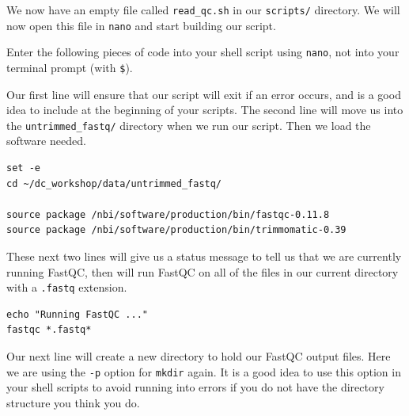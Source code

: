 \documentclass[
  letterpaper,
  DIV=11,
  numbers=noendperiod]{scrreprt}
\newenvironment{Shaded}{\begin{snugshade}}{\end{snugshade}}
\newcommand{\ExtensionTok}[1]{\textcolor[rgb]{0.00,0.23,0.31}{#1}}
\newcommand{\NormalTok}[1]{\textcolor[rgb]{0.00,0.23,0.31}{#1}}
\begin{document}
We now have an empty file called \texttt{read\_qc.sh} in our
\texttt{scripts/} directory. We will now open this file in \texttt{nano}
and start building our script.

\begin{Shaded}
\end{Shaded}

\begin{tcolorbox}[enhanced jigsaw, toptitle=1mm, breakable, bottomrule=.15mm, colback=white, toprule=.15mm, opacityback=0, bottomtitle=1mm, coltitle=black, opacitybacktitle=0.6, rightrule=.15mm, colframe=quarto-callout-warning-color-frame, titlerule=0mm, colbacktitle=quarto-callout-warning-color!10!white, title=\textcolor{quarto-callout-warning-color}{\faExclamationTriangle}\hspace{0.5em}{Warning}, left=2mm, leftrule=.75mm, arc=.35mm]

Enter the following pieces of code into your shell script using
\texttt{nano}, not into your terminal prompt (with \texttt{\$}).

\end{tcolorbox}

Our first line will ensure that our script will exit if an error occurs,
and is a good idea to include at the beginning of your scripts. The
second line will move us into the \texttt{untrimmed\_fastq/} directory
when we run our script. Then we load the software needed.

\begin{verbatim}
set -e
cd ~/dc_workshop/data/untrimmed_fastq/

source package /nbi/software/production/bin/fastqc-0.11.8
source package /nbi/software/production/bin/trimmomatic-0.39
\end{verbatim}

These next two lines will give us a status message to tell us that we
are currently running FastQC, then will run FastQC on all of the files
in our current directory with a \texttt{.fastq} extension.

\begin{verbatim}
echo "Running FastQC ..."
fastqc *.fastq*
\end{verbatim}

Our next line will create a new directory to hold our FastQC output
files. Here we are using the \texttt{-p} option for \texttt{mkdir}
again. It is a good idea to use this option in your shell scripts to
avoid running into errors if you do not have the directory structure you
think you do.
\end{document}
